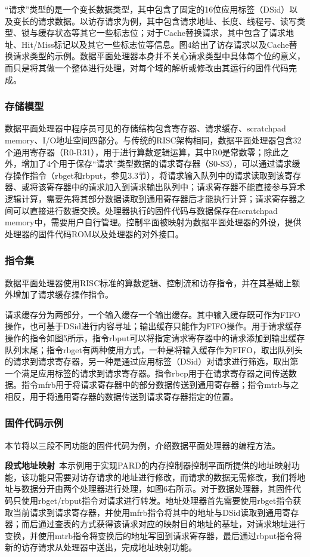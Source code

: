 ``请求''类型的是一个变长数据类型，其中包含了固定的16位应用标签（DSid）以及变长的请求数据。以访存请求为例，其中包含请求地址、长度、线程号、读写类型、锁与缓存状态等其它一些标志位；对于Cache替换请求，其中包含了请求地址、Hit/Miss标记以及其它一些标志位等信息。图4给出了访存请求以及Cache替换请求类型的示例。数据平面处理器本身并不关心请求类型中具体每个位的意义，而只是将其做一个整体进行处理，对每个域的解析或修改由其运行的固件代码完成。

\subsubsection{存储模型}
数据平面处理器中程序员可见的存储结构包含寄存器、请求缓存、scratchpad memory、I/O地址空间四部分。与传统的RISC架构相同，数据平面处理器包含32个通用寄存器（R0-R31），用于进行算数逻辑运算，其中R0是常数零；除此之外，增加了4个用于保存``请求''类型数据的请求寄存器（S0-S3），可以通过请求缓存操作指令（rbget和rbput，参见3.3节），将请求输入队列中的请求读取到该寄存器、或将该寄存器中的请求加入到请求输出队列中；请求寄存器不能直接参与算术逻辑计算，需要先将其部分数据读取到通用寄存器后才能执行计算；请求寄存器之间可以直接进行数据交换。处理器执行的固件代码与数据保存在scratchpad memory中，需要用户自行管理。控制平面被映射为数据平面处理器的外设，提供处理器的固件代码ROM以及处理器的对外接口。

\subsubsection{指令集}
数据平面处理器使用RISC标准的算数逻辑、控制流和访存指令，并在其基础上额外增加了请求缓存操作指令。

请求缓存分为两部分，一个输入缓存一个输出缓存。其中输入缓存既可作为FIFO操作，也可基于DSid进行内容寻址；输出缓存只能作为FIFO操作。用于请求缓存操作的指令如图5所示，指令rbput可以将指定请求寄存器中的请求添加到输出缓存队列末尾；指令rbget有两种使用方式，一种是将输入缓存作为FIFO，取出队列头的请求到请求寄存器，另一种是通过应用标签（DSid）对请求进行筛选，取出第一个满足应用标签的请求到请求寄存器。指令rbcp用于在请求寄存器之间传送数据。指令mfrb用于将请求寄存器中的部分数据传送到通用寄存器；指令mtrb与之相反，用于将通用寄存器的数据传送到请求寄存器指定的位置。

\subsubsection{固件代码示例}
本节将以三段不同功能的固件代码为例，介绍数据平面处理器的编程方法。

\textbf{段式地址映射}\ 本示例用于实现PARD的内存控制器控制平面所提供的地址映射功能，该功能只需要对访存请求的地址进行修改，而请求的数据无需修改，我们将地址与数据分开由两个处理器进行处理，如图6右所示。对于数据处理器，其固件代码只使用rbget/rbput指令对请求进行转发。地址处理器首先需要使用rbget指令获取当前请求到请求寄存器，并使用mfrb指令将其中的地址与DSid读取到通用寄存器；而后通过查表的方式获得该请求对应的映射目的地址的基址，对请求地址进行变换，并使用mtrb指令将变换后的地址写回到请求寄存器，最后通过rbput指令将新的访存请求从处理器中送出，完成地址映射功能。
 
